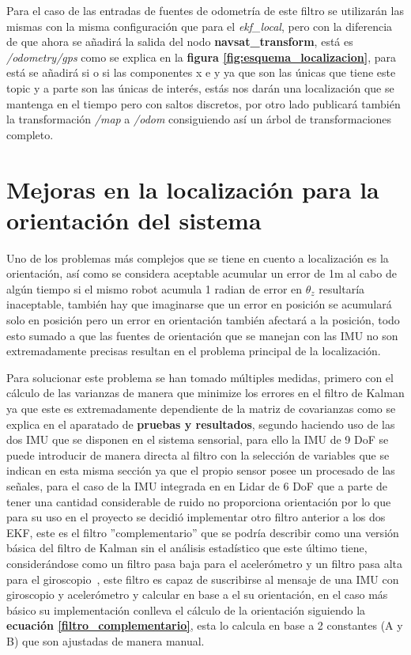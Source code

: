 Para el caso de las entradas de fuentes de odometría de este filtro se utilizarán las mismas con la misma configuración que para el 
\textit{ekf\_local}, pero con la diferencia de que ahora se añadirá la salida del nodo \textbf{navsat\_transform}, está es 
\textit{/odometry/gps} como se explica en la \textbf{figura \ref{fig:esquema_localizacion}}, para está se añadirá si o si las 
componentes x e y ya que son las únicas que tiene este topic y a parte son las únicas de interés,
 estás nos darán una localización que se mantenga en el tiempo pero con saltos discretos, por otro lado publicará 
también la transformación \textit{/map} a \textit{/odom} consiguiendo así un árbol de transformaciones completo.


\section{Mejoras en la localización para la orientación del sistema}

Uno de los problemas más complejos que se tiene en cuento a localización es la orientación, así como se considera aceptable acumular un error de 1m al cabo de 
algún tiempo si el mismo robot acumula 1 radian de error en \begin{math}\theta_{z}\end{math} resultaría inaceptable, también hay que imaginarse que un error en posición se acumulará solo en posición pero un error en orientación también 
afectará a la posición, todo esto sumado a que las fuentes de orientación que se manejan con las IMU no son extremadamente precisas resultan en el problema principal de la localización.

Para solucionar este problema se han tomado múltiples medidas, primero con el cálculo de las varianzas de manera que minimize los errores en el filtro de Kalman ya que este es extremadamente dependiente de la matriz de covarianzas como se explica en el aparatado 
de \textbf{pruebas y resultados}, segundo haciendo uso de las dos IMU que se disponen en el sistema sensorial, para ello la IMU de 9 DoF se puede introducir de manera directa al filtro con la selección de variables que se indican en esta misma sección ya que el propio sensor posee un procesado de las señales, para el 
caso de la IMU integrada en en Lidar de 6 DoF que a parte de tener una cantidad considerable de ruido no proporciona orientación por lo que para su uso en el proyecto se decidió 
implementar otro filtro anterior a los dos EKF, este es el filtro ''complementario'' que se podría describir como una versión básica del filtro de Kalman sin el análisis estadístico 
que este último tiene, considerándose como un filtro pasa baja para el acelerómetro y un filtro pasa alta para el giroscopio~\cite{sanchez2018algoritmo}, este filtro es capaz de suscribirse al mensaje de una IMU con giroscopio y acelerómetro y calcular en base a el su orientación, en el caso más básico su implementación 
conlleva el cálculo de la orientación siguiendo la \textbf{ecuación \ref{filtro_complementario}}, esta lo calcula en base a 2 constantes (A y B) que son ajustadas de manera manual.

